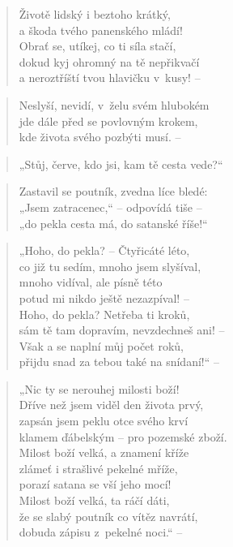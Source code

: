 \begin{verse}
Životě lidský i beztoho krátký, \\
a škoda tvého panenského mládí! \\
Obrať se, utíkej, co ti síla stačí, \\
dokud kyj ohromný na tě nepřikvačí \\
a neroztříští tvou hlavičku v~kusy! --
\end{verse}

\begin{verse}
Neslyší, nevidí, v~želu svém hlubokém \\
jde dále před se povlovným krokem, \\
kde života svého pozbýti musí. --
\end{verse}

\begin{verse}
„Stůj, červe, kdo jsi, kam tě cesta vede?“
\end{verse}

\begin{verse}
Zastavil se poutník, zvedna líce bledé: \\
„Jsem zatracenec,“ -- odpovídá tiše -- \\
„do pekla cesta má, do satanské říše!“
\end{verse}

\begin{verse}
„Hoho, do pekla? -- Čtyřicáté léto, \\
co již tu sedím, mnoho jsem slyšíval, \\
mnoho vidíval, ale písně této \\
potud mi nikdo ještě nezazpíval! -- \\
Hoho, do pekla? Netřeba ti kroků, \\
sám tě tam dopravím, nevzdechneš ani! -- \\
Však a se naplní můj počet roků, \\
přijdu snad za tebou také na snídaní!“ --
\end{verse}

\begin{verse}
„Nic ty se nerouhej milosti boží! \\
Dříve než jsem viděl den života prvý, \\
zapsán jsem peklu otce svého krví \\
klamem ďábelským -- pro pozemské zboží. \\
Milost boží velká, a znamení kříže \\
zlámeť i strašlivé pekelné mříže, \\
porazí satana se vší jeho mocí! \\
Milost boží velká, ta ráčí dáti, \\
že se slabý poutník co vítěz navrátí, \\
dobuda zápisu z~pekelné noci.“ --
\end{verse}

